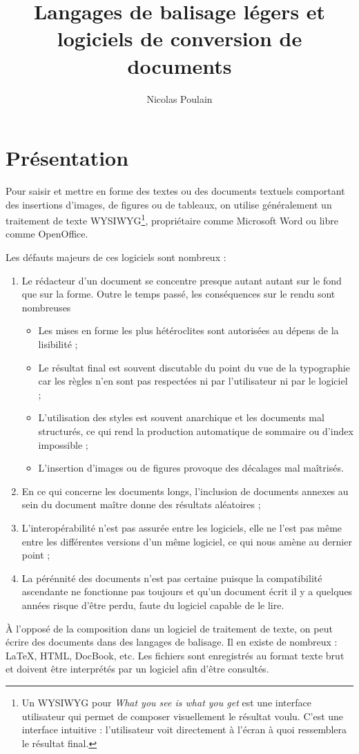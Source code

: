 \documentclass[]{article}
\title{Langages de balisage légers et logiciels de conversion de documents}
\author{Nicolas Poulain}
\begin{document}
\maketitle

\section{Présentation}

Pour saisir et mettre en forme des textes ou des documents textuels
comportant des insertions d'images, de figures ou de tableaux, on
utilise généralement un traitement de texte WYSIWYG\footnote{Un WYSIWYG
  pour \emph{What you see is what you get} est une interface utilisateur
  qui permet de composer visuellement le résultat voulu. C'est une
  interface intuitive : l'utilisateur voit directement à l'écran à quoi
  ressemblera le résultat final.}, propriétaire comme Microsoft Word ou
libre comme OpenOffice.

Les défauts majeurs de ces logiciels sont nombreux :

\begin{enumerate}[1.]
\item
  Le rédacteur d'un document se concentre presque autant autant sur le
  fond que sur la forme. Outre le temps passé, les conséquences sur le
  rendu sont nombreuses
  \begin{itemize}
  \item
    Les mises en forme les plus hétéroclites sont autorisées au dépens
    de la lisibilité ;
  \item
    Le résultat final est souvent discutable du point du vue de la
    typographie car les règles n'en sont pas respectées ni par
    l'utilisateur ni par le logiciel ;
  \item
    L'utilisation des styles est souvent anarchique et les documents mal
    structurés, ce qui rend la production automatique de sommaire ou
    d'index impossible ;
  \item
    L'insertion d'images ou de figures provoque des décalages mal
    maîtrisés.
  \end{itemize}
\item
  En ce qui concerne les documents longs, l'inclusion de documents
  annexes au sein du document maître donne des résultats aléatoires ;
\item
  L'interopérabilité n'est pas assurée entre les logiciels, elle ne
  l'est pas même entre les différentes versions d'un même logiciel, ce
  qui nous amène au dernier point ;
\item
  La pérénnité des documents n'est pas certaine puisque la compatibilité
  ascendante ne fonctionne pas toujours et qu'un document écrit il y a
  quelques années risque d'être perdu, faute du logiciel capable de le
  lire.
\end{enumerate}
À l'opposé de la composition dans un logiciel de traitement de texte, on
peut écrire des documents dans des langages de balisage. Il en existe de
nombreux : LaTeX, HTML, DocBook, etc. Les fichiers sont enregistrés au
format texte brut et doivent être interprétés par un logiciel afin
d'être consultés.
\end{document}
